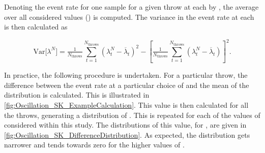 Denoting the event rate for one sample for a given throw  at each  by , the average over all considered  values () is computed. The variance in the event rate at each  is then calculated as

\begin{equation}
  \mathrm{Var}\Big[\lambda^{N}\Big] = \tfrac{1}{N_\mathrm{throws}} \sum_{t=1}^{N_\mathrm{throws}} \left(\lambda_t^{N} - \overline \lambda_t\right)^2 - \left[\tfrac{1}{N_\mathrm{throws}} \sum_{t=1}^{N_\mathrm{throws}} \left(\lambda_t^{N} - \overline \lambda_t\right)\right]^2 .
  \label{eq:Oscillation_SK_Variance}
\end{equation}

In practice, the following procedure is undertaken. For a particular throw, the difference between the event rate at a particular choice of  and the mean of the distribution is calculated. This is illustrated in \autoref{fig:Oscillation_SK_ExampleCalculation}. This value is then calculated for all the  throws, generating a distribution of . This is repeated for each of the values of  considered within this study. The distributions of this value, for , are given in \autoref{fig:Oscillation_SK_DifferenceDistribution}. As expected, the distribution gets narrower and tends towards zero for the higher values of . 

